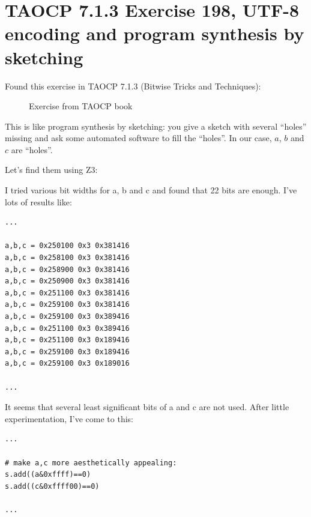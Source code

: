 \section{TAOCP 7.1.3 Exercise 198, UTF-8 encoding and program synthesis by sketching}

Found this exercise in TAOCP 7.1.3 (Bitwise Tricks and Techniques):

\begin{figure}[H]
\centering
{}
\caption{Exercise from TAOCP book}
\end{figure}

This is like program synthesis by sketching: you give a sketch with several ``holes'' missing and ask some
automated software to fill the ``holes''.
In our case, $a$, $b$ and $c$ are ``holes''.

Let's find them using Z3:



I tried various bit widths for a, b and c and found that 22 bits are enough.
I've lots of results like:

\begin{lstlisting}
...

a,b,c = 0x250100 0x3 0x381416
a,b,c = 0x258100 0x3 0x381416
a,b,c = 0x258900 0x3 0x381416
a,b,c = 0x250900 0x3 0x381416
a,b,c = 0x251100 0x3 0x381416
a,b,c = 0x259100 0x3 0x381416
a,b,c = 0x259100 0x3 0x389416
a,b,c = 0x251100 0x3 0x389416
a,b,c = 0x251100 0x3 0x189416
a,b,c = 0x259100 0x3 0x189416
a,b,c = 0x259100 0x3 0x189016

...
\end{lstlisting}

It seems that several least significant bits of a and c are not used.
After little experimentation, I've come to this:

\begin{lstlisting}
...

# make a,c more aesthetically appealing:
s.add((a&0xffff)==0)
s.add((c&0xffff00)==0)

...
\end{lstlisting}

